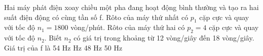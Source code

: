 \begin{vidu} %
	Hai máy phát điện xoay chiều một pha đang hoạt động bình thường và tạo ra hai suất điện động có cùng tần số f. Rôto của máy thứ nhất có $p_1$ cặp cực và quay với tốc độ $n_1 = 1800$ vòng/phút. Rôto của máy thứ hai có $p_2 = 4$ cặp cực và quay với tốc độ $n_2$. Biết $n_2$ có giá trị trong khoảng từ 12 vòng/giây đến 18 vòng/giây. Giá trị của f là
	\choice
	{54 Hz}
	{ Hz}
	{48 Hz}
	{50 Hz}
\end{vidu}
